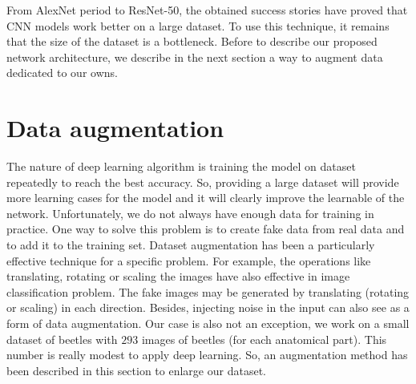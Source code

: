 \documentclass[review]{elsarticle}
\begin{document}
From AlexNet period to ResNet-50, the obtained success stories \cite{krizhevsky2012imagenet,he2016deep} have proved that CNN models work better on a large dataset. To use this technique, it remains that the size of the dataset is a bottleneck. Before to describe our proposed network architecture, we describe in the next section a way to augment data dedicated to our owns.


\section{Data augmentation}
\label{Sdataaug}

The nature of deep learning algorithm is training the model on dataset repeatedly to reach the best accuracy. So, providing a large dataset will provide more learning cases for the model and it will clearly improve the learnable of the network. Unfortunately, we do not always have enough data for training in practice. One way to solve this problem is to create fake data from real data and to add it to the training set. Dataset augmentation has been a particularly effective technique for a specific problem. For example, the operations like translating, rotating or scaling the images have also effective in image classification problem. The fake images may be generated by translating (rotating or scaling) in each direction. Besides, injecting noise in the input can also see as a form of data augmentation. Our case is also not an exception, we work on a small dataset of beetles with $293$ images of beetles (for each anatomical part). This number is really modest to apply deep learning. So, an augmentation method has been described in this section to enlarge our dataset.
\end{document}
